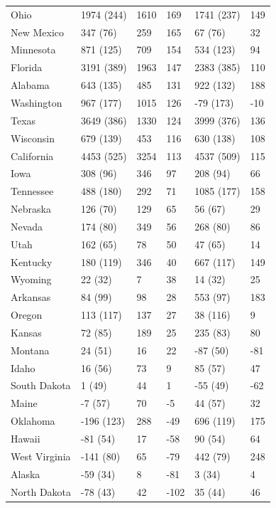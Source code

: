 \documentclass[11pt]{article}
\begin{document}
\begin{table}
\begin{tabular}{|l|lll|ll|}
  Ohio & 1974 (244) & 1610 & 169 & 1741 (237) & 149 \\ 
  New Mexico & 347 (76) & 259 & 165 & 67 (76) & 32 \\ 
  Minnesota & 871 (125) & 709 & 154 & 534 (123) & 94 \\ 
  Florida & 3191 (389) & 1963 & 147 & 2383 (385) & 110 \\ 
  Alabama & 643 (135) & 485 & 131 & 922 (132) & 188 \\ 
  Washington & 967 (177) & 1015 & 126 & -79 (173) & -10 \\ 
  Texas & 3649 (386) & 1330 & 124 & 3999 (376) & 136 \\ 
  Wisconsin & 679 (139) & 453 & 116 & 630 (138) & 108 \\ 
  California & 4453 (525) & 3254 & 113 & 4537 (509) & 115 \\ 
  Iowa & 308 (96) & 346 & 97 & 208 (94) & 66 \\ 
  Tennessee & 488 (180) & 292 & 71 & 1085 (177) & 158 \\ 
  Nebraska & 126 (70) & 129 & 65 & 56 (67) & 29 \\ 
  Nevada & 174 (80) & 349 & 56 & 268 (80) & 86 \\ 
  Utah & 162 (65) & 78 & 50 & 47 (65) & 14 \\ 
  Kentucky & 180 (119) & 346 & 40 & 667 (117) & 149 \\ 
  Wyoming & 22 (32) & 7 & 38 & 14 (32) & 25 \\ 
  Arkansas & 84 (99) & 98 & 28 & 553 (97) & 183 \\ 
  Oregon & 113 (117) & 137 & 27 & 38 (116) & 9 \\ 
  Kansas & 72 (85) & 189 & 25 & 235 (83) & 80 \\ 
  Montana & 24 (51) & 16 & 22 & -87 (50) & -81 \\ 
  Idaho & 16 (56) & 73 & 9 & 85 (57) & 47 \\ 
  South Dakota & 1 (49) & 44 & 1 & -55 (49) & -62 \\ 
  Maine & -7 (57) & 70 & -5 & 44 (57) & 32 \\ 
  Oklahoma & -196 (123) & 288 & -49 & 696 (119) & 175 \\ 
  Hawaii & -81 (54) & 17 & -58 & 90 (54) & 64 \\ 
  West Virginia & -141 (80) & 65 & -79 & 442 (79) & 248 \\ 
  Alaska & -59 (34) & 8 & -81 & 3 (34) & 4 \\ 
  North Dakota & -78 (43) & 42 & -102 & 35 (44) & 46 \\

\end{tabular}
\end{table}
\end{document}
